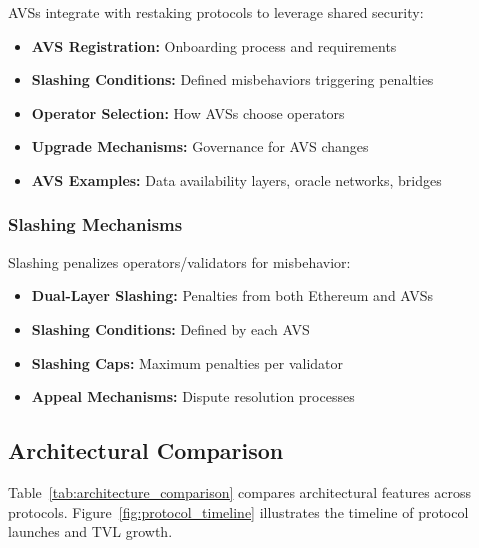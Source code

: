 \documentclass[runningheads]{llncs}
\begin{document}
AVSs integrate with restaking protocols to leverage shared security:
\begin{itemize}
    \item \textbf{AVS Registration:} Onboarding process and requirements
    \item \textbf{Slashing Conditions:} Defined misbehaviors triggering penalties~\cite{certora2025,durvasula2024robust}
    \item \textbf{Operator Selection:} How AVSs choose operators
    \item \textbf{Upgrade Mechanisms:} Governance for AVS changes
    \item \textbf{AVS Examples:} Data availability layers, oracle networks, bridges~\cite{zhang2024proof,das2025reliablocks}
\end{itemize}

\subsubsection{Slashing Mechanisms}

Slashing penalizes operators/validators for misbehavior:
\begin{itemize}
    \item \textbf{Dual-Layer Slashing:} Penalties from both Ethereum and AVSs
    \item \textbf{Slashing Conditions:} Defined by each AVS
    \item \textbf{Slashing Caps:} Maximum penalties per validator
    \item \textbf{Appeal Mechanisms:} Dispute resolution processes
\end{itemize}

\subsection{Architectural Comparison}

Table~\ref{tab:architecture_comparison} compares architectural features across protocols. Figure~\ref{fig:protocol_timeline} illustrates the timeline of protocol launches and TVL growth.
\end{document}
